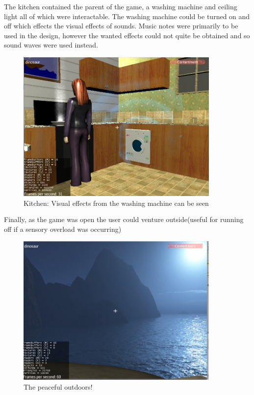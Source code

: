 \documentclass[11pt]{report}
\begin{document}
The kitchen contained the parent of the game, a washing machine and ceiling light all of which were interactable. The washing machine could be turned on and off which effects the visual effects of sounds. Music notes were primarily to be used in the design, however the wanted effects could not quite be obtained and so sound waves were used instead.  

\begin{figure}[H]
\centering
\includegraphics[width=100mm]{images/prototype/kitchen_washingm.png}
\caption{Kitchen: Visual effects from the washing machine can be seen}
\label{prototype_kitchenwash}
\end{figure}

Finally, as the game was open the user could venture outside(useful for running off if a sensory overload was occurring)

\begin{figure}[H]
\centering
\includegraphics[width=100mm]{images/prototype/outside.png}
\caption{The peaceful outdoors!}
\label{prototype_kitchen1}
\end{figure}
\end{document}
